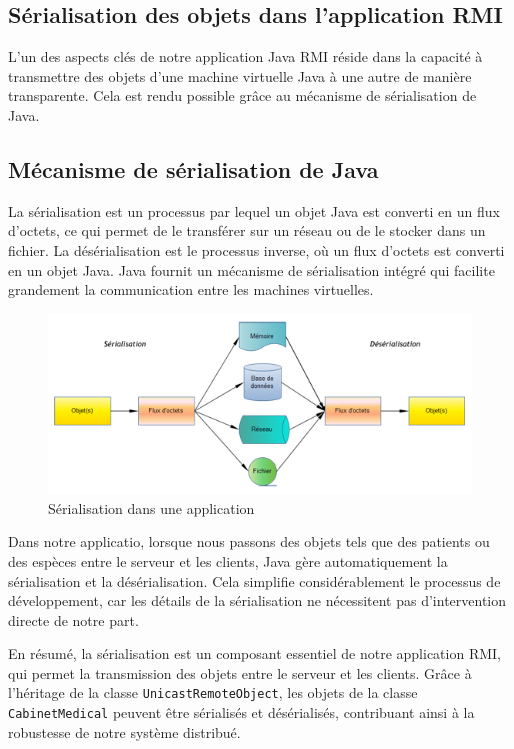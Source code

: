 \documentclass{article} %
\begin{document}
\subsection{Sérialisation des objets dans l'application RMI}

L'un des aspects clés de notre application Java RMI réside dans la 
capacité à transmettre des objets d'une machine virtuelle Java à une autre de 
manière transparente. Cela est rendu possible grâce au mécanisme de sérialisation de Java.

\subsection{Mécanisme de sérialisation de Java}

La sérialisation est un processus par lequel un objet Java est converti en un flux d'octets, 
ce qui permet de le transférer sur un réseau ou de le stocker dans un fichier. 
La désérialisation est le processus inverse, où un flux d'octets est converti en un objet Java. 
Java fournit un mécanisme de sérialisation intégré qui facilite grandement la communication entre 
les machines virtuelles.

\begin{figure}[h]
    \centering
    \includegraphics[width=1\textwidth]{serialisation}
    \caption{Sérialisation dans une application}
    \label{fig:serialisation}
\end{figure}

Dans notre applicatio, lorsque nous passons des objets tels que des patients 
ou des espèces entre le serveur et les clients, 
Java gère automatiquement la sérialisation et la désérialisation. Cela simplifie considérablement 
le processus de développement, car les détails de la sérialisation ne nécessitent pas 
d'intervention directe de notre part.

En résumé, la sérialisation est un composant essentiel de notre application RMI, 
qui permet la transmission des objets entre le serveur et les clients. 
Grâce à l'héritage de la classe \texttt{UnicastRemoteObject}, 
les objets de la classe \texttt{CabinetMedical} peuvent être sérialisés et désérialisés, 
contribuant ainsi à la robustesse de notre système distribué.
\end{document}
